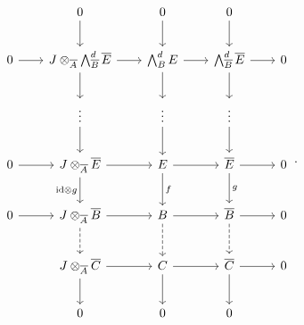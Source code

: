 \[
\begin{tikzcd}[column sep=2.0em, row sep=2.1em]
 & 0 \arrow[d] & 0 \arrow[d] & 0 \arrow[d] &
 \\
 0 \arrow[r]
 &
 J\otimes_{\overline A}
   \bigwedge_{\overline B}^{d}\overline E
   \arrow[r]
   \arrow[d]
 &
 \bigwedge_B^{d}E
   \arrow[r]
   \arrow[d]
 &
 \bigwedge_{\overline B}^{d}\overline E
   \arrow[r]
   \arrow[d]
 &
 0
 \\
 & \vdots \arrow[d] & \vdots \arrow[d] & \vdots \arrow[d] &
 \\
 0 \arrow[r]
 &
 J\otimes_{\overline A}\overline E
   \arrow[r]
   \arrow[d,"\mathrm{id}\otimes g"']
 &
 E
   \arrow[r]
   \arrow[d,"f"]
 &
 \overline E
   \arrow[r]
   \arrow[d,"g"]
 &
 0
 \\
 0 \arrow[r]
 &
 J\otimes_{\overline A}\overline B
   \arrow[r]
   \arrow[d,dashed]
 &
 B
   \arrow[r]
   \arrow[d,dashed]
 &
 \overline B
   \arrow[r]
   \arrow[d,dashed]
 &
 0
 \\
 &
 J\otimes_{\overline A}\overline C
   \arrow[r]
   \arrow[d]
 &
 C
   \arrow[r]
   \arrow[d]
 &
 \overline C
   \arrow[r]
   \arrow[d]
 &
 0
 \\
 & 0 & 0 & 0 &
\end{tikzcd}
\, .
\]
